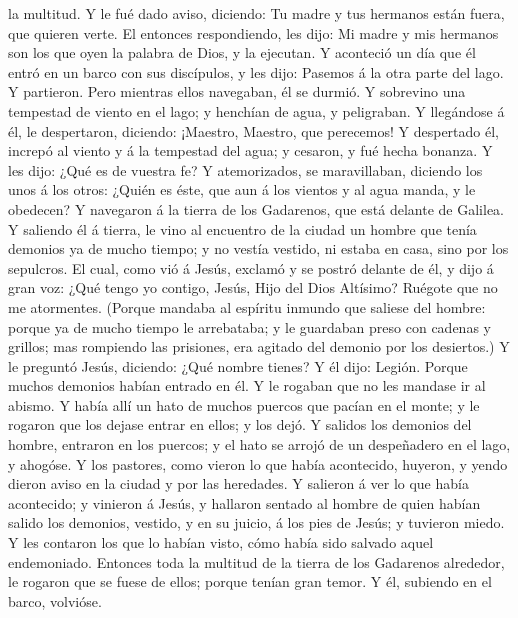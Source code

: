la multitud.  Y le fué dado aviso, diciendo: Tu madre y tus
hermanos están fuera, que quieren verte.  El entonces
respondiendo, les dijo: Mi madre y mis hermanos son los que oyen la
palabra de Dios, y la ejecutan.  Y aconteció un día que él
entró en un barco con sus discípulos, y les dijo: Pasemos á la otra
parte del lago. Y partieron.  Pero mientras ellos
navegaban, él se durmió. Y sobrevino una tempestad de viento en el lago;
y henchían de agua, y peligraban.  Y llegándose á él, le
despertaron, diciendo: ¡Maestro, Maestro, que perecemos! Y despertado
él, increpó al viento y á la tempestad del agua; y cesaron, y fué hecha
bonanza.  Y les dijo: ¿Qué es de vuestra fe? Y
atemorizados, se maravillaban, diciendo los unos á los otros: ¿Quién es
éste, que aun á los vientos y al agua manda, y le obedecen?
 Y navegaron á la tierra de los Gadarenos, que está delante
de Galilea.  Y saliendo él á tierra, le vino al encuentro
de la ciudad un hombre que tenía demonios ya de mucho tiempo; y no
vestía vestido, ni estaba en casa, sino por los sepulcros. 
El cual, como vió á Jesús, exclamó y se postró delante de él, y dijo á
gran voz: ¿Qué tengo yo contigo, Jesús, Hijo del Dios Altísimo? Ruégote
que no me atormentes.  (Porque mandaba al espíritu inmundo
que saliese del hombre: porque ya de mucho tiempo le arrebataba; y le
guardaban preso con cadenas y grillos; mas rompiendo las prisiones, era
agitado del demonio por los desiertos.)  Y le preguntó
Jesús, diciendo: ¿Qué nombre tienes? Y él dijo: Legión. Porque muchos
demonios habían entrado en él.  Y le rogaban que no les
mandase ir al abismo.  Y había allí un hato de muchos
puercos que pacían en el monte; y le rogaron que los dejase entrar en
ellos; y los dejó.  Y salidos los demonios del hombre,
entraron en los puercos; y el hato se arrojó de un despeñadero en el
lago, y ahogóse.  Y los pastores, como vieron lo que había
acontecido, huyeron, y yendo dieron aviso en la ciudad y por las
heredades.  Y salieron á ver lo que había acontecido; y
vinieron á Jesús, y hallaron sentado al hombre de quien habían salido
los demonios, vestido, y en su juicio, á los pies de Jesús; y tuvieron
miedo.  Y les contaron los que lo habían visto, cómo había
sido salvado aquel endemoniado.  Entonces toda la multitud
de la tierra de los Gadarenos alrededor, le rogaron que se fuese de
ellos; porque tenían gran temor. Y él, subiendo en el barco, volvióse.
